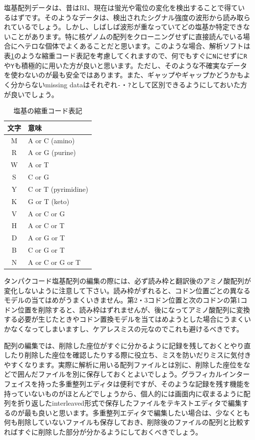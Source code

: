 \documentclass[titlepage,10pt,a4paper]{jsbook}
\begin{document}
塩基配列データは、昔はRI、現在は蛍光や電位の変化を検出することで得ているはずです。そのようなデータは、検出されたシグナル強度の波形から読み取られているでしょう。しかし、しばしば波形が重なっていてどの塩基か特定できないことがあります。特に核ゲノムの配列をクローニングせずに直接読んでいる場合にヘテロな個体でよくあることだと思います。このような場合、解析ソフトは表\ref{table:notation_of_degeneracy}のような縮重コード表記を考慮してくれますので、何でもすぐに\texttt{N}にせずに\texttt{R}や\texttt{Y}も積極的に用いた方が良いと思います。ただし、そのような不確実なデータを使わないのが最も安全ではあります。また、ギャップやギャップかどうかもよく分からないmissing dataはそれぞれ\texttt{-}・\texttt{?}として区別できるようにしておいた方が良いでしょう。
\begin{table}[h]
\begin{center}
\footnotesize\setlength{\baselineskip}{0.9em}%
\begin{tabular}{cl}
文字 & 意味 \\\hline\hline
M & A or C (amino) \\
R & A or G (purine) \\
W & A or T \\
S & C or G \\
Y & C or T (pyrimidine) \\
K & G or T (keto) \\
V & A or C or G \\
H & A or C or T \\
D & A or G or T \\
B & C or G or T \\
N & A or C or G or T \\
\end{tabular}
\end{center}
\caption{塩基の縮重コード表記}\label{table:notation_of_degeneracy}
\end{table}

タンパクコード塩基配列の編集の際には、必ず読み枠と翻訳後のアミノ酸配列が変化しないように注意して下さい。読み枠がずれると、コドン位置ごとの異なるモデルの当てはめがうまくいきません。第2・3コドン位置と次のコドンの第1コドン位置を削除すると、読み枠はずれませんが、後になってアミノ酸配列に変換する必要が生じたときやコドン置換モデルを当てはめようとした場合にうまくいかなくなってしまいますし、ケアレスミスの元なのでこれも避けるべきです。

配列の編集では、削除した座位がすぐに分かるように記録を残しておくとやり直したり削除した座位を確認したりする際に役立ち、ミスを防いだりミスに気付きやすくなります。実際に解析に用いる配列ファイルとは別に、削除した座位を\texttt{{\lbrack}{\rbrack}}などで囲んだファイルを別に保存しておくとよいでしょう。グラフィカルインターフェイスを持った多重整列エディタは便利ですが、そのような記録を残す機能を持っていないものがほとんどでしょうから、個人的には画面内に収まるように配列を折り返したinterleaved形式で保存したファイルをテキストエディタで編集するのが最も良いと思います。多重整列エディタで編集したい場合は、少なくとも何も削除していないファイルも保存しておき、削除後のファイルの配列と比較すればすぐに削除した部分が分かるようにしておくべきでしょう。
\end{document}
